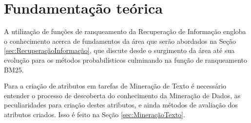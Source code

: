 \chapter{Fundamentação teórica} \label{ch:FundamentaçãoTeórica}
    A utilização de funções de ranqueamento da Recuperação de Informação engloba o conhecimento acerca de fundamentos da área que serão abordados na Seção \ref{sec:RecuperaçãoInformação}, que discute desde o surgimento da área até sua evolução para os métodos probabilísticos culminando na função de ranqueamento BM25.

    Para a criação de atributos em tarefas de Mineração de Texto é necessário entender o processo de descoberta do conhecimento da Mineração de Dados, as peculiaridades para criação destes atributos, e ainda métodos de avaliação dos atributos criados. 
    Isso é feito na Seção \ref{sec:MineraçãoTexto}.

    

    \newpage

    
